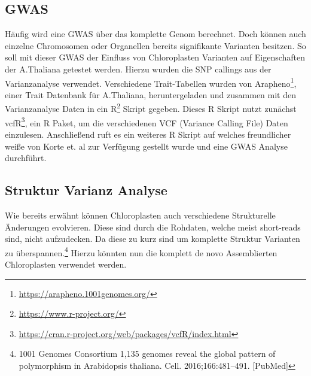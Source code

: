 \documentclass{scrartcl}
\begin{document}
\subsection{GWAS}
\label{sec-2-4}
Häufig wird eine GWAS über das komplette Genom berechnet. Doch können auch einzelne Chromosomen oder Organellen bereits signifikante Varianten besitzen. 
So soll mit dieser GWAS der Einfluss von Chloroplasten Varianten auf Eigenschaften der A.Thaliana getestet werden. Hierzu wurden die SNP callings aus der Varianzanalyse verwendet.
Verschiedene Trait-Tabellen wurden von Arapheno\footnote{\url{https://arapheno.1001genomes.org/}}, einer Trait Datenbank für A.Thaliana, heruntergeladen und zusammen mit den Varianzanalyse Daten in ein R\footnote{\url{https://www.r-project.org/}} Skript gegeben.
Dieses R Skript nutzt zunächst vcfR\footnote{\url{https://cran.r-project.org/web/packages/vcfR/index.html}}, ein R Paket, um die verschiedenen VCF (Variance Calling File) Daten einzulesen. Anschließend ruft es ein weiteres R Skript auf welches
freundlicher weiße von Korte et. al\footnotemark[34]{} zur Verfügung gestellt wurde und eine GWAS Analyse durchführt.

\subsection{Struktur Varianz Analyse}
\label{sec-2-5}
Wie bereits erwähnt können Chloroplasten auch verschiedene Strukturelle Änderungen evolvieren. Diese sind durch die Rohdaten, welche meist short-reads sind, nicht aufzudecken.
Da diese zu kurz sind um komplette Struktur Varianten zu überspannen.\footnote{1001 Genomes Consortium 1,135 genomes reveal the global pattern of polymorphism in Arabidopsis thaliana. Cell. 2016;166:481–491. [PubMed]}
Hierzu könnten nun die komplett de novo Assemblierten Chloroplasten verwendet werden. 
\end{document}
